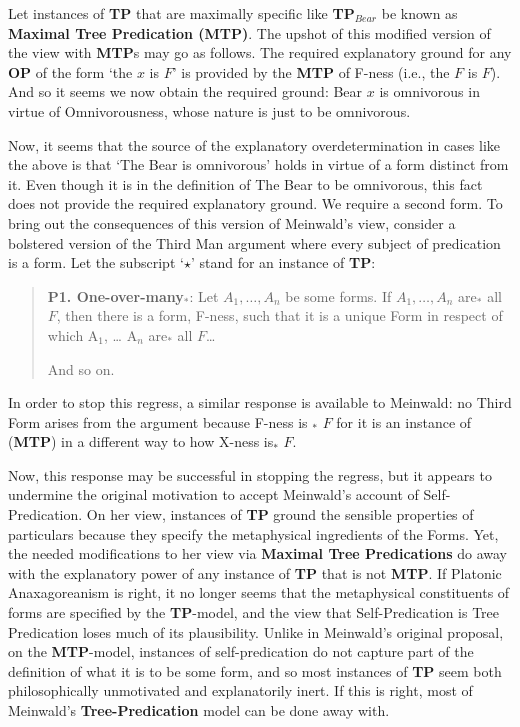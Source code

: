 \noindent Let instances of \textbf{TP} that are maximally specific like \textbf{TP$_{Bear}$} be known as \textbf{Maximal Tree Predication (MTP)}. The upshot of this modified version of the view with \textbf{MTP}s may go as follows. The required explanatory ground for any \textbf{OP} of the form `the $x$ is $F$' is provided by the \textbf{MTP} of F-ness (i.e., the $F$ is $F$). And so it seems we now obtain the required ground: Bear $x$ is omnivorous in virtue of Omnivorousness, whose nature is just to be omnivorous.

Now, it seems that the source of the explanatory overdetermination in cases like the above is that `The Bear is omnivorous' holds in virtue of a form distinct from it. Even though it is  in the definition of The Bear to be omnivorous, this fact does not provide the required explanatory ground. We require a second form. To bring out the consequences of this version of Meinwald's view, consider a bolstered version of the Third Man argument where every subject of predication is a form. Let the subscript `$\star$' stand for an instance of \textbf{TP}:
\begin{quote}
\textbf{P1. One-over-many$_*$}: Let $A_1,\dots  , A_n$ be some forms. If $A_1,\dots , A_n$ are$_*$ all $F$, then there is a form, F-ness, such that it is a unique Form in respect of which A$_1$, … A$_n$ are$_*$ all $F$\dots 

And so on. 
\end{quote}

\noindent In order to stop this regress, a similar response is available to Meinwald: no Third Form arises from the argument because F-ness is $_*$ $F$ for it is an instance of (\textbf{MTP}) in a different way to how X-ness is$_*$ $F$. 

Now, this response may be successful in stopping the regress, but it appears to undermine the original motivation to accept Meinwald's account of Self-Predication. On her view, instances of \textbf{TP} ground the sensible properties of particulars because they specify the metaphysical ingredients of the Forms. Yet, the needed modifications to her view via \textbf{Maximal Tree Predications} do away with the explanatory power of any instance of \textbf{TP} that is not \textbf{MTP}. If Platonic Anaxagoreanism is right, it no longer seems that the metaphysical constituents of forms are specified by the \textbf{TP}-model, and the view that Self-Predication is Tree Predication loses much of its plausibility. Unlike in Meinwald's original proposal, on the \textbf{MTP}-model, instances of self-predication do not capture part of the definition of what it is to be some form, and so most instances of \textbf{TP} seem both philosophically unmotivated and explanatorily inert. If this is right, most of Meinwald's \textbf{Tree-Predication} model can be done away with. 

